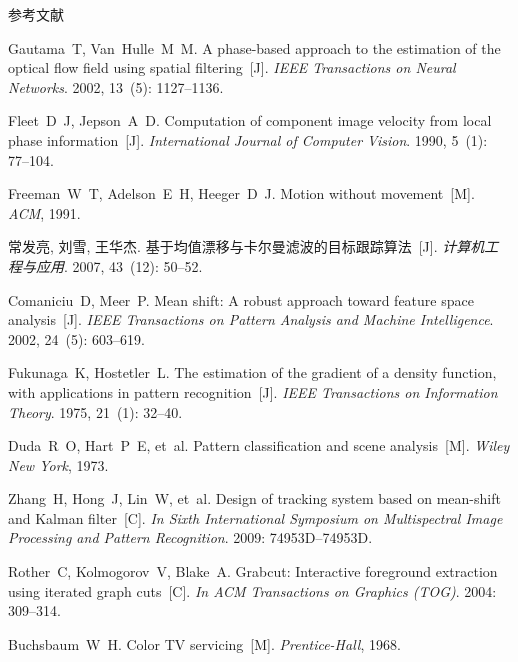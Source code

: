 \documentclass[xcolor=svgnames,serif,table]{beamer}
\begin{document}
\begin{frame}[allowframebreaks]{参考文献}
\begin{thebibliography}{10}
Gautama~T, Van~Hulle~M~M.
\newblock A phase-based approach to the estimation of the optical flow field using
  spatial filtering~[J].
\newblock \emph{IEEE Transactions on Neural Networks}.
2002, 13~(5):  1127--1136.

Fleet~D~J, Jepson~A~D.
\newblock Computation of component image velocity from local phase information~[J].
\newblock \emph{International Journal of Computer Vision}.
1990, 5~(1):  77--104.

{\beamertemplatebookbibitems
{}
Freeman~W~T, Adelson~E~H, Heeger~D~J.
\newblock Motion without movement~[M].
\newblock \emph{ACM}, 1991.}

常发亮, 刘雪, 王华杰.
\newblock 基于均值漂移与卡尔曼滤波的目标跟踪算法~[J].
\newblock \emph{计算机工程与应用}.
2007, 43~(12):  50--52.

Comaniciu~D, Meer~P.
\newblock Mean shift: A robust approach toward feature space analysis~[J].
\newblock \emph{IEEE Transactions on Pattern Analysis and Machine Intelligence}.
2002, 24~(5):  603--619.

Fukunaga~K, Hostetler~L.
\newblock The estimation of the gradient of a density function, with applications in
  pattern recognition~[J].
\newblock \emph{IEEE Transactions on Information Theory}.
1975, 21~(1):  32--40.

{\beamertemplatebookbibitems
{}
Duda~R~O, Hart~P~E, et~al.
\newblock Pattern classification and scene analysis~[M].
\newblock \emph{Wiley New York}, 1973.}

Zhang~H, Hong~J, Lin~W, et~al.
\newblock Design of tracking system based on mean-shift and Kalman filter~[C].
\newblock \emph{In Sixth International Symposium on Multispectral Image Processing and Pattern Recognition}.
2009:  74953D--74953D.

Rother~C, Kolmogorov~V, Blake~A.
\newblock Grabcut: Interactive foreground extraction using iterated graph cuts~[C].
\newblock \emph{In ACM Transactions on Graphics (TOG)}.
2004:  309--314.

{\beamertemplatebookbibitems
{}
Buchsbaum~W~H.
\newblock Color TV servicing~[M].
\newblock \emph{Prentice-Hall}, 1968.}


\end{thebibliography}
\end{frame}
\end{document}
